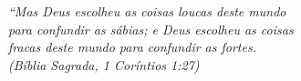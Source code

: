 \begin{epigrafe}
    \vspace*{\fill}
	\begin{flushright}

		\textit{``Mas Deus escolheu as coisas loucas deste mundo\\
		          para confundir as sábias; e Deus escolheu as coisas\\ fracas deste mundo para confundir as fortes.\\
		          (Bíblia Sagrada, 1 Coríntios 1:27)}
	\end{flushright}
\end{epigrafe}
